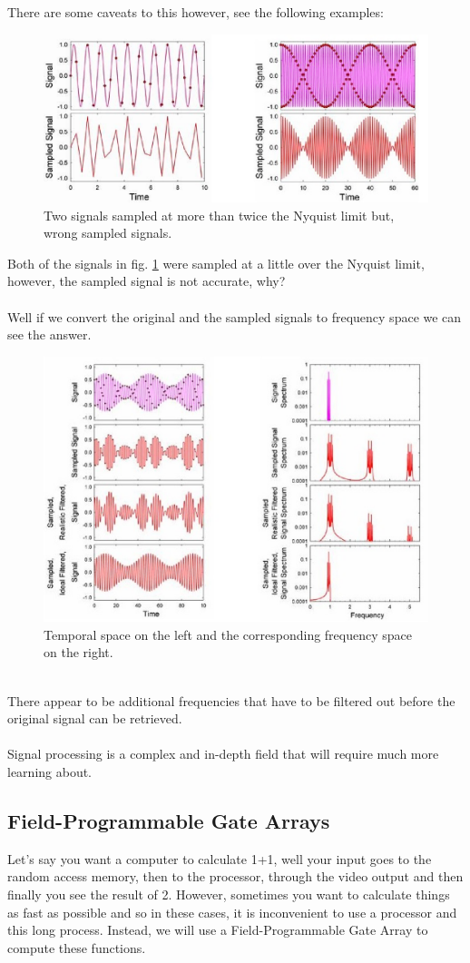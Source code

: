 \documentclass{article}
\begin{document}
There are some caveats to this however, see the following examples:

\begin{figure}[!phbt]
    \centering
    \includegraphics[width=0.65\linewidth]{img/nyquistlimit.eps}
    \caption{Two signals sampled at more than twice the Nyquist limit but, wrong sampled signals.}
    \label{fig:nyquistlimit}
\end{figure}
Both of the signals in fig. \ref{fig:nyquistlimit} were sampled at a little over the Nyquist limit, however, the sampled signal is not accurate, why?
\\
\
\\
Well if we convert the original and the sampled signals to frequency space we can see the answer.
\begin{figure}[!phbt]
    \centering
    \includegraphics[width=0.75\linewidth]{img/frequencyspace.eps}
    \caption{Temporal space on the left and the corresponding frequency space on the right.}
    \label{fig:frequencyspace}
\end{figure}
\\
There appear to be additional frequencies that have to be filtered out before the original signal can be retrieved.
\\
\
\\
Signal processing is a complex and in-depth field that will require much more learning about.

\pagebreak

\subsection{Field-Programmable Gate Arrays}
Let's say you want a computer to calculate 1+1, well your input goes to the random access memory, then to the processor, through the video output and then finally you see the result of 2. However, sometimes you want to calculate things as fast as possible and so in these cases, it is inconvenient to use a processor and this long process. Instead, we will use a Field-Programmable Gate Array to compute these functions.
\end{document}
